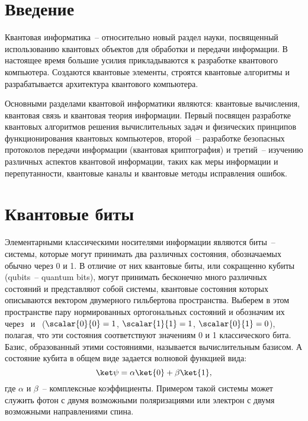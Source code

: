 \documentclass[pscyr,notitlepage]{hedwork}
\renewcommand{\~}[1]{\widetilde{#1}}
\begin{document}
  \onehalfspacing
  \tableofcontents
  
  \section*{Введение}
  
  Квантовая информатика~-- относительно новый раздел науки, посвященный
  использованию квантовых объектов для обработки и передачи информации.
  В настоящее время большие усилия прикладываются к разработке квантового
  компьютера. Создаются квантовые элементы, строятся квантовые алгоритмы и
  разрабатывается архитектура квантового компьютера.
  
  Основными разделами квантовой информатики являются: квантовые вычисления,
  квантовая связь и квантовая теория информации. Первый посвящен разработке
  квантовых алгоритмов решения вычислительных задач и физических принципов
  функционирования квантовых компьютеров, второй~-- разработке безопасных
  протоколов передачи информации (квантовая криптография) и третий~-- изучению
  различных аспектов квантовой информации, таких как меры информации и
  перепутанности, квантовые каналы и квантовые методы исправления
  ошибок.~\cite{main,task,brbr}
  
  \section{Квантовые биты}
  Элементарными классическими носителями информации являются биты~-- системы,
  которые могут принимать два различных состояния, обозначаемых обычно
  через 0 и 1. В отличие от них квантовые биты, или сокращенно кубиты
  (qubits~-- quantum bits), могут принимать бесконечно много различных
  состояний и представляют собой системы, квантовые состояния которых
  описываются вектором двумерного гильбертова пространства. Выберем в этом
  пространстве пару нормированных ортогональных состояний и обозначим их
  через~ и~ (\( \scalar{0}{0} = 1 \), \( \scalar{1}{1} = 1 \),
  \( \scalar{0}{1} = 0 \)), полагая, что эти состояния соответствуют значениям
  0 и 1 классического бита. Базис, образованный этими состояниями, называется
  вычислительным базисом. А состояние кубита в общем виде задается волновой
  функцией вида:
  \begin{equation}
    \ket\psi = \alpha\ket{0} + \beta\ket{1},
    \label{eq:1.1}
  \end{equation}
  где \( \alpha \) и \( \beta \)~-- комплексные коэффициенты. Примером такой
  системы может служить фотон с двумя возможными поляризациями или электрон
  с двумя возможными направлениями спина.
  
\end{document}
